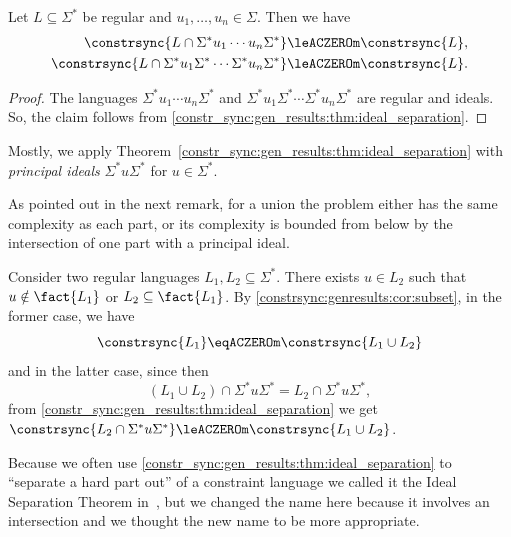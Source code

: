 \begin{corollary}
	Let $L \subseteq \Sigma^*$ be regular
	and $u_1, \ldots, u_n \in \Sigma$.
	Then we have 
	\begin{align*}
	\constrsync{L\cap \Sigma^*u_1\cdots u_n\Sigma^*} & \leACZEROm \constrsync{L}, \\
	\constrsync{L\cap \Sigma^*u_1 \Sigma^* \cdots \Sigma^* u_n \Sigma^*} & \leACZEROm \constrsync{L}.
	\end{align*}
\end{corollary}
\begin{proof}
	The languages
	 $\Sigma^*u_1\cdots u_n\Sigma^*$
	 and $\Sigma^*u_1 \Sigma^* \cdots \Sigma^* u_n \Sigma^*$
	 are regular and ideals.
	 So, the claim follows from \cref{constr_sync:gen_results:thm:ideal_separation}.		
\end{proof}

Mostly, we apply Theorem~\ref{constr_sync:gen_results:thm:ideal_separation}
with \emph{principal ideals} $\Sigma^* u \Sigma^*$
for $u \in \Sigma^*$.

As pointed out in the next remark, for a union the problem either has the same complexity as each part, or its complexity is bounded from below by the intersection of one part with a principal ideal.

\begin{remark}\label{constrsync:compl:ideal_intersection_for_unions}
	Consider two regular languages $L_1, L_2 \subseteq \Sigma^*$.
	There exists $u \in L_2$
	such that $u \notin \fact{L_1}$
	or $L_2 \subseteq \fact{L_1}$.
	By \cref{constrsync:genresults:cor:subset},
	in the former case, 
	we have
	\[
	\constrsync{L_1} \eqACZEROm \constrsync{L_1\cup L_2}
	\]
	and in the latter case, since then
	\[
	( L_1 \cup L_2 )  \cap \Sigma^* u \Sigma^* = L_2 \cap \Sigma^* u \Sigma^*,
	\]
	from \cref{constr_sync:gen_results:thm:ideal_separation}
	we get 
	$\constrsync{L_2 \cap \Sigma^*u \Sigma^*} \leACZEROm \constrsync{L_1\cup L_2}$.
\end{remark}

Because we often use \cref{constr_sync:gen_results:thm:ideal_separation} to ``separate
a hard part out'' of a constraint language we called it the Ideal Separation Theorem
in~\cite{HoffmannCocoonExtended}, but we changed the name here because it involves an intersection
and we thought the new name to be more appropriate.

